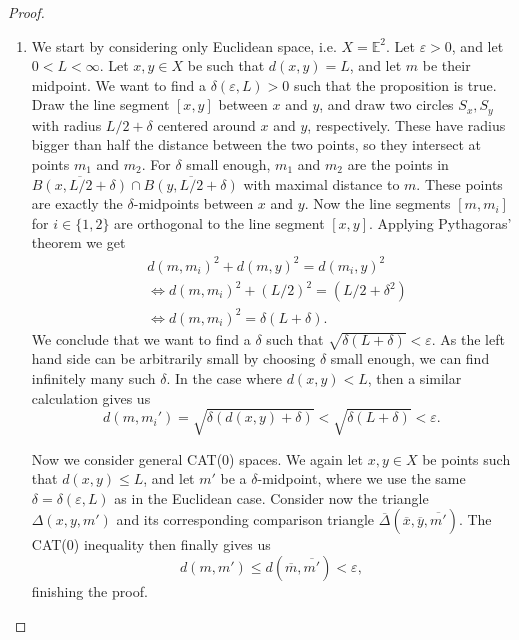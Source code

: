 \documentclass[11pt, a4paper, oneside]{memoir}
\theoremstyle{plain}\newtheorem{theorem}[subsection]{Theorem}
\theoremstyle{definition}
\newcommand{\E}{\mathbb{E}}
\begin{document}
\begin{proof}
\begin{enumerate}
    \item We start by considering only Euclidean space, i.e. \(X=\E^2\).
Let \(\varepsilon>0\), and let \(0<L<\infty\).
Let \(x,y\in X\) be such that \(d(x,y)=L\), and let \(m\) be their midpoint.
We want to find a \(\delta(\varepsilon,L)>0\) such that the proposition is true.
Draw the line segment \([x,y]\) between \(x\) and \(y\), and draw two circles \(S_x,S_y\) with radius \(L/2+\delta\) centered around \(x\) and \(y\), respectively.
These have radius bigger than half the distance between the two points, so they intersect at points \(m_1\) and \(m_2\).
For \(\delta\) small enough, \(m_1\) and \(m_2\) are the points in \(\overline{B(x,L/2+\delta)}\cap \overline{B(y,L/2+\delta)}\) with maximal distance to \(m\).
These points are exactly the \(\delta\)-midpoints between \(x\) and \(y\).
Now the line segments \([m,m_i]\) for \(i\in\{1,2\}\) are orthogonal to the line segment \([x,y]\).
Applying Pythagoras' theorem we get
\begin{align*}
&d(m,m_i)^2+d(m,y)^2=d(m_i,y)^2\\
&\iff d(m,m_i)^2+(L/2)^2=(L/2+\delta^2)\\
&\iff d(m,m_i)^2=\delta(L+\delta).
\end{align*}
We conclude that we want to find a \(\delta\) such that \(\sqrt{\delta(L+\delta)}<\varepsilon\).
As the left hand side can be arbitrarily small by choosing \(\delta\) small enough, we can find infinitely many such \(\delta\).
In the case where \(d(x,y)<L\), then a similar calculation gives us 
\[d(m,m_i')=\sqrt{\delta(d(x,y)+\delta)}<\sqrt{\delta(L+\delta)}<\varepsilon.\]

Now we consider general CAT($0$) spaces.
We again let \(x,y\in X\) be points such that \(d(x,y)\leq L\), and let \(m'\) be a \(\delta\)-midpoint, where we use the same \(\delta=\delta(\varepsilon,L)\) as in the Euclidean case.
Consider now the triangle \(\Delta(x,y,m')\) and its corresponding comparison triangle \(\overline{\Delta}(\overline{x},\overline{y},\overline{m'})\).
The CAT($0$) inequality then finally gives us
\[d(m,m')\leq d(\overline{m},\overline{m'})<\varepsilon,\]
finishing the proof.
\end{enumerate}
\end{proof}



\end{document}
